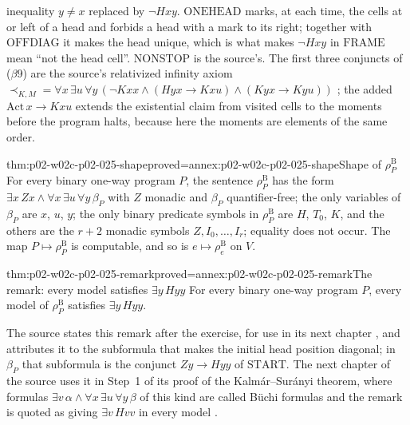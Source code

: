 inequality \(y\neq x\) replaced by \(\neg Hxy\).  \(\mathrm{ONEHEAD}\) marks, at
each time, the cells at or left of a head and forbids a head with a mark to its
right; together with \(\mathrm{OFFDIAG}\) it makes the head unique, which is
what makes \(\neg Hxy\) in \(\mathrm{FRAME}\) mean ``not the head cell''.
\(\mathrm{NONSTOP}\) is the source's.  The first three conjuncts of
(\(\beta\)9) are the source's relativized infinity axiom
\(\prec_{K,M}=\forall x\,\exists u\,\forall y\,(\neg Kxx\land(Hyx\to Kxu)\land
(Kyx\to Kyu))\) \cite[Sect.~2.1.2, p.~35]{BorgerGradelGurevich1997}; the
added \(\mathrm{Act}\,x\to Kxu\) extends the existential claim from visited
cells to the moments before the program halts, because here the moments are
elements of the same order.

\begin{hblemma}{thm:p02-w02c-p02-025-shape}{proved=annex:p02-w02c-p02-025-shape}{Shape of \(\rho^{\mathrm B}_P\)}
For every binary one-way program \(P\), the sentence \(\rho^{\mathrm B}_P\) has
the form \(\exists x\,Zx\land\forall x\,\exists u\,\forall y\,\beta_P\) with
\(Z\) monadic and \(\beta_P\) quantifier-free; the only variables of
\(\beta_P\) are \(x\), \(u\), \(y\); the only binary predicate symbols in
\(\rho^{\mathrm B}_P\) are \(H\), \(T_0\), \(K\), and the others are the
\(r+2\) monadic symbols \(Z,I_0,\ldots,I_r\); equality does not occur.  The
map \(P\mapsto\rho^{\mathrm B}_P\) is computable, and so is
\(e\mapsto\rho^{\mathrm B}_e\) on \(V\).
\end{hblemma}

\begin{hblemma}{thm:p02-w02c-p02-025-remark}{proved=annex:p02-w02c-p02-025-remark}{The remark: every model satisfies \(\exists y\,Hyy\)}
For every binary one-way program \(P\), every model of \(\rho^{\mathrm B}_P\)
satisfies \(\exists y\,Hyy\).
\end{hblemma}

The source states this remark after the exercise, for use in its next chapter
\cite[Sect.~2.1.2, p.~36]{BorgerGradelGurevich1997}, and attributes it to the
subformula that makes the initial head position diagonal; in \(\beta_P\) that
subformula is the conjunct \(Zy\to Hyy\) of \(\mathrm{START}\).  The next
chapter of the source uses it in Step~1 of its proof of the
Kalm\'ar--Sur\'anyi theorem, where formulas
\(\exists v\,\alpha\land\forall x\,\exists u\,\forall y\,\beta\) of this kind
are called B\"uchi formulas and the remark is quoted as giving \(\exists v\,Hvv\)
in every model \cite[Sect.~3.2, pp.~115--116]{BorgerGradelGurevich1997}.


